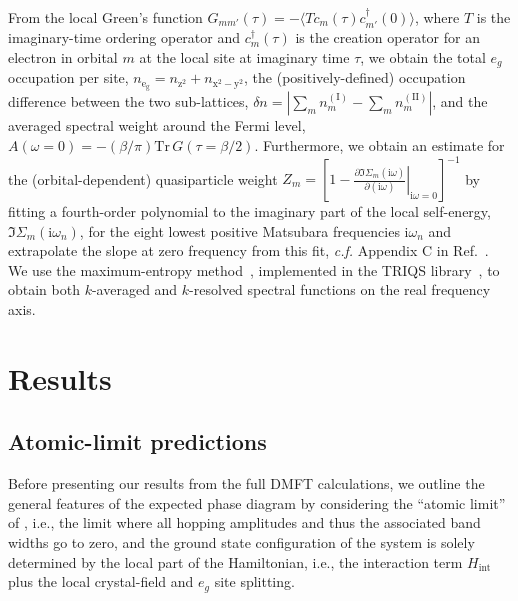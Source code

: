 \documentclass[aps,prb,twocolumn,superscriptaddress,10pt]{revtex4-1}
\newcommand{\pref}[1]{\prettyref{#1}}%
\newcommand{\iu}{\ensuremath{\mathrm{i}}} %
\newcommand{\eg}{\ensuremath{{e_g}}\xspace}
\begin{document}
From the local Green's function \mbox{$G_{mm'}(\tau) = - \langle T c_m(\tau) c^\dagger_{m'}(0) \rangle$}, where $T$ is the imaginary-time ordering operator and $c^\dagger_m(\tau)$ is the creation operator for an electron in orbital $m$ at the local site at imaginary time $\tau$, 
we obtain the total \eg occupation per site, $n_\mathrm{e_g} = n_\mathrm{z^2} + n_\mathrm{x^2-y^2}$, the (positively-defined) occupation difference between the two sub-lattices, $\delta n = |\sum_m n_m^\mathrm{(I)} - \sum_m n_m^\mathrm{(II)}|$, 
and the averaged spectral weight around the Fermi level, \mbox{$A(\omega=0) = - (\beta/\pi) \mathrm{Tr}\, G(\tau=\beta/2)$}.
%
Furthermore, we obtain an estimate for the (orbital-dependent) quasiparticle weight $Z_m = \left[1 - \left. \frac{\partial \Im \Sigma_m(\iu\omega)}{\partial (\iu\omega)} \right|_{\iu\omega=0}  \right]^{-1}$ by fitting a fourth-order polynomial to the imaginary part of the local self-energy, $\Im \Sigma_m (\iu\omega_n)$, for the eight lowest positive Matsubara frequencies $\iu\omega_n$ and extrapolate the slope at zero frequency from this fit, {\it c.f.} Appendix C in Ref.~.
%
We use the maximum-entropy method~\cite{jarrell_bayesian_1996}, implemented in the TRIQS library~\cite{maxent}, to obtain both $k$-averaged and $k$-resolved spectral functions on the real frequency axis.

\section{Results}\label{sec:results}

\subsection{Atomic-limit predictions}
\label{sec:atomic-limit}

Before presenting our results from the full DMFT calculations, we outline the general features of the expected phase diagram by considering the ``atomic limit'' of \pref{eq:ham}, i.e., the limit where all hopping amplitudes and thus the associated band widths go to zero, and the ground state configuration of the system is solely determined by the local part of the Hamiltonian, i.e., the interaction term $H_\text{int}$ plus the local crystal-field and \eg site splitting.
\end{document}
